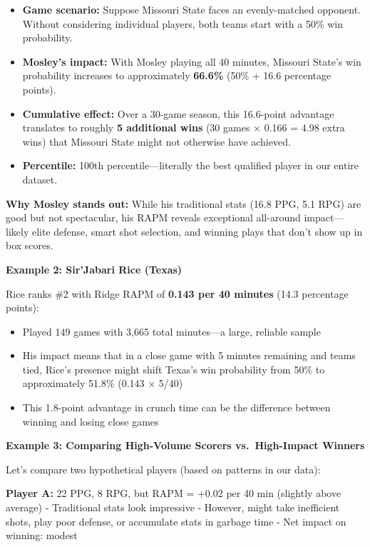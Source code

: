 \documentclass[
  letterpaper,
  DIV=11,
  numbers=noendperiod]{scrartcl}
\providecommand{\tightlist}{%
  \setlength{\itemsep}{0pt}\setlength{\parskip}{0pt}}
\begin{document}
\begin{itemize}
\tightlist
\item
  \textbf{Game scenario:} Suppose Missouri State faces an evenly-matched
  opponent. Without considering individual players, both teams start
  with a 50\% win probability.
\item
  \textbf{Mosley's impact:} With Mosley playing all 40 minutes, Missouri
  State's win probability increases to approximately \textbf{66.6\%}
  (50\% + 16.6 percentage points).
\item
  \textbf{Cumulative effect:} Over a 30-game season, this 16.6-point
  advantage translates to roughly \textbf{5 additional wins} (30 games ×
  0.166 = 4.98 extra wins) that Missouri State might not otherwise have
  achieved.
\item
  \textbf{Percentile:} 100th percentile---literally the best qualified
  player in our entire dataset.
\end{itemize}

\textbf{Why Mosley stands out:} While his traditional stats (16.8 PPG,
5.1 RPG) are good but not spectacular, his RAPM reveals exceptional
all-around impact---likely elite defense, smart shot selection, and
winning plays that don't show up in box scores.

\textbf{Example 2: Sir'Jabari Rice (Texas)}

Rice ranks \#2 with Ridge RAPM of \textbf{0.143 per 40 minutes} (14.3
percentage points):

\begin{itemize}
\tightlist
\item
  Played 149 games with 3,665 total minutes---a large, reliable sample
\item
  His impact means that in a close game with 5 minutes remaining and
  teams tied, Rice's presence might shift Texas's win probability from
  50\% to approximately 51.8\% (0.143 × 5/40)
\item
  This 1.8-point advantage in crunch time can be the difference between
  winning and losing close games
\end{itemize}

\textbf{Example 3: Comparing High-Volume Scorers vs.~High-Impact
Winners}

Let's compare two hypothetical players (based on patterns in our data):

\textbf{Player A:} 22 PPG, 8 RPG, but RAPM = +0.02 per 40 min (slightly
above average) - Traditional stats look impressive - However, might take
inefficient shots, play poor defense, or accumulate stats in garbage
time - Net impact on winning: modest
\end{document}
